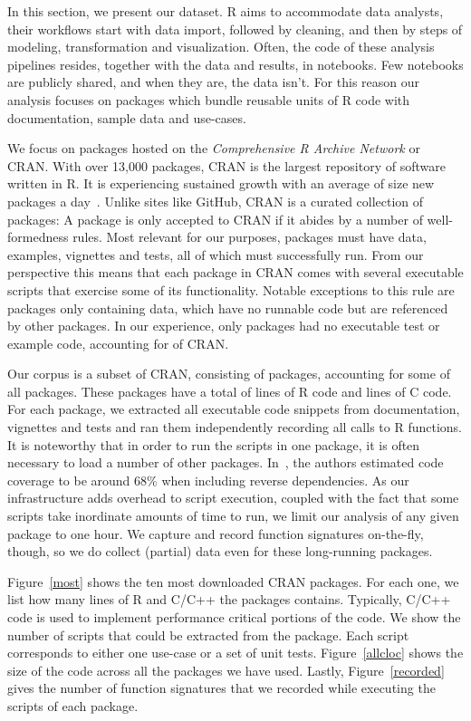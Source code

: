 \documentclass[acmsmall,10pt,review,anonymous]{acmart}\settopmatter{printfolios=true,printccs=false,printacmref=false}
\begin{document}
In this section, we present our dataset. R aims to accommodate data
analysts, their workflows start with data import, followed by cleaning, and
then by steps of modeling, transformation and visualization. Often, the code
of these analysis pipelines resides, together with the data and results, in
notebooks. Few notebooks are publicly shared, and when they are, the data
isn't. For this reason our analysis focuses on packages which bundle
reusable units of R code with documentation, sample data and use-cases.

We focus on packages hosted on the \emph{Comprehensive R Archive Network} or
CRAN.  With over 13,000 packages, CRAN is the largest repository of software
written in R. It is experiencing sustained growth with an average of size
new packages a day~\cite{LIgges2017}.  Unlike sites like GitHub, CRAN is a
curated collection of packages: A package is only accepted to CRAN if it
abides by a number of well-formedness rules.  Most relevant for our
purposes, packages must have data, examples, vignettes and tests, all of
which must successfully run. From our perspective this means that each
package in CRAN comes with several executable scripts that exercise some of
its functionality.  Notable exceptions to this rule are packages only
containing data, which have no runnable code but are referenced by other
packages.
In our experience, only \DATAPKGS packages had no executable test or example code,
accounting for \DATAPKGSPERC of CRAN.

Our corpus is a subset of CRAN, consisting of \PACKAGES packages, accounting
for some \PERCENTCRAN of all packages.  These packages have a total of \RLOC
lines of R code and \CLOC lines of C code. For each package, we extracted
all executable code snippets from documentation, vignettes and tests and ran
them independently recording all calls to R functions.  It is noteworthy that
in order to run the scripts in one package, it is often necessary to load a
number of other packages.  In~\cite{issta18}, the authors estimated code
coverage to be around 68\% when including reverse dependencies.  As our infrastructure
adds overhead to script execution, coupled with the fact that some scripts take 
inordinate amounts of time to run, we limit our analysis of any given package to one hour.
We capture and record function signatures on-the-fly, though, so we do collect (partial) data even 
for these long-running packages.

Figure~\ref{most} shows the ten most downloaded CRAN packages.  For each
one, we list how many lines of R and C/C++ the packages contains.
Typically, C/C++ code is used to implement performance critical portions of
the code. We show the number of scripts that could be extracted from the
package. Each script corresponds to either one use-case or a set of unit
tests.  Figure~\ref{allcloc} shows the size of the code across all the
packages we have used.  Lastly, Figure~\ref{recorded} gives the number of
function signatures that we recorded while executing the scripts of each
package.
\end{document}
